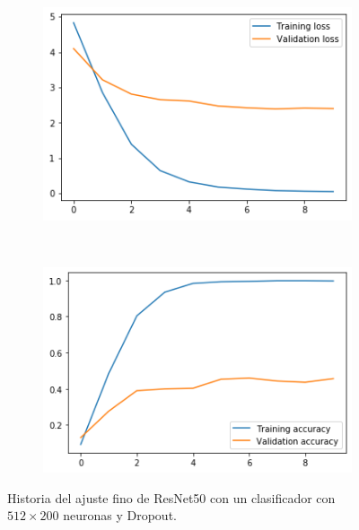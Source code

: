 \documentclass[11pt,a4paper]{article}
\begin{document}
\begin{figure}[H]
  \centering
  \begin{subfigure}{.5\textwidth}
    \centering
    \includegraphics[scale=0.4]{img/fine2-loss.png}
    \label{fig:fine2-loss}
  \end{subfigure}%
  ~ \quad
  \begin{subfigure}{.5\textwidth}
    \centering
    \includegraphics[scale=0.4]{img/fine2-acc.png}
    \label{fig:fine2-acc}
  \end{subfigure}
  \caption{Historia del ajuste fino de ResNet50 con un clasificador con $512 \times 200$ neuronas y Dropout.}
  \label{fig:history-fine2}
\end{figure}
\end{document}
